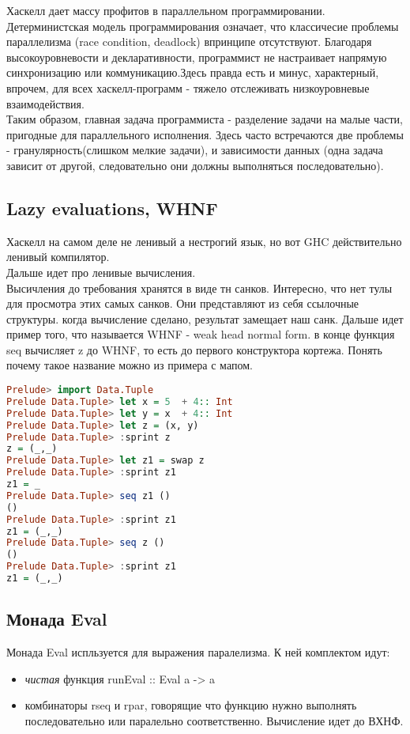 \documentclass[10pt,a4paper]{article}
\begin{document}
Хаскелл дает массу профитов в параллельном программировании. Детерминистская модель программирования означает, что классичесие проблемы параллелизма (race condition, deadlock) впринципе отсутствуют. Благодаря высокоуровневости и декларативности, программист не настраивает напрямую синхронизацию или коммуникацию.Здесь правда есть и минус, характерный, впрочем, для всех хаскелл-программ - тяжело отслеживать низкоуровневые взаимодействия.\\
Таким образом, главная задача программиста - разделение задачи на малые части, пригодные для параллельного исполнения. Здесь часто встречаются две проблемы - гранулярность(слишком мелкие задачи), и зависимости данных (одна задача зависит от другой, следовательно они должны выполняться последовательно).\\
\subsection{Lazy evaluations, WHNF}
Хаскелл на самом деле не ленивый а нестрогий язык, но вот GHC действительно ленивый компилятор.\\
Дальше идет про ленивые вычисления.\\
Высичления до требования хранятся в виде тн санков. Интересно, что нет тулы для просмотра этих самых санков. Они представляют из себя ссылочные структуры. когда вычисление сделано, результат замещает наш санк. Дальше идет пример того, что называется WHNF - weak head normal form. в конце функция seq вычисляет z до WHNF, то есть до первого конструктора кортежа. Понять почему такое название можно из примера с мапом.  \\

\begin{lstlisting}[language=Haskell]
Prelude> import Data.Tuple
Prelude Data.Tuple> let x = 5  + 4:: Int
Prelude Data.Tuple> let y = x  + 4:: Int
Prelude Data.Tuple> let z = (x, y)
Prelude Data.Tuple> :sprint z
z = (_,_)
Prelude Data.Tuple> let z1 = swap z
Prelude Data.Tuple> :sprint z1
z1 = _
Prelude Data.Tuple> seq z1 ()
()
Prelude Data.Tuple> :sprint z1
z1 = (_,_)
Prelude Data.Tuple> seq z ()
()
Prelude Data.Tuple> :sprint z1
z1 = (_,_)
\end{lstlisting}

\subsection{Монада Eval}

Монада Eval испльзуется для выражения паралелизма. К ней комплектом идут:
\begin{itemize}
\item \textit{чистая} функция runEval :: Eval a -> a
\item комбинаторы rseq и rpar, говорящие что функцию нужно выполнять последовательно или паралельно соответственно. Вычисление идет до ВХНФ.
\end{itemize}
\end{document}
